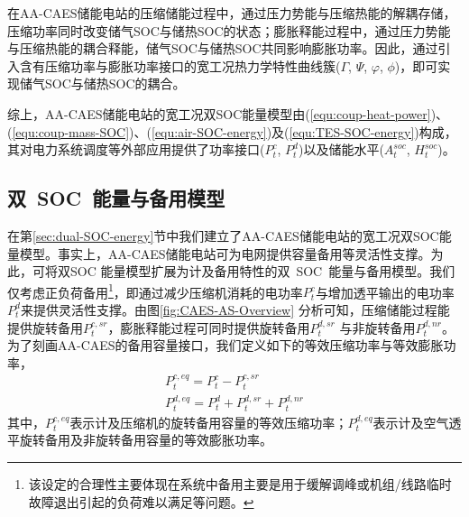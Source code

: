在AA-CAES储能电站的压缩储能过程中，通过压力势能与压缩热能的解耦存储，压缩功率同时改变储气SOC与储热SOC的状态；膨胀释能过程中，通过压力势能与压缩热能的耦合释能，储气SOC与储热SOC共同影响膨胀功率。因此，通过引入含有压缩功率与膨胀功率接口的宽工况热力学特性曲线簇($\Gamma$, $\Psi$, $\varphi$, $\phi$)，即可实现储气SOC与储热SOC的耦合。

综上，AA-CAES储能电站的宽工况双SOC能量模型由(\ref{equ:coup-heat-power})、(\ref{equ:coup-mass-SOC})、(\ref{equ:air-SOC-energy})及(\ref{equ:TES-SOC-energy})构成，其对电力系统调度等外部应用提供了功率接口($P_t^c$, $P_t^d$)以及储能水平($A_t^{soc}$, $H_t^{soc}$)。

\subsection{双~SOC~能量与备用模型}
\label{sec:dual-SOC-Reserve}

在第\ref{sec:dual-SOC-energy}节中我们建立了AA-CAES储能电站的宽工况双SOC能量模型。事实上，AA-CAES储能电站可为电网提供容量备用等灵活性支撑。为此，可将双SOC 能量模型扩展为计及备用特性的双~SOC~能量与备用模型。我们仅考虑正负荷备用\footnote{该设定的合理性主要体现在系统中备用主要是用于缓解调峰或机组/线路临时故障退出引起的负荷难以满足等问题。}，即通过减少压缩机消耗的电功率$P_t^c$与增加透平输出的电功率$P_t^d$来提供灵活性支撑。由图\ref{fig:CAES-AS-Overview} 分析可知，压缩储能过程能提供旋转备用$P_t^{c,sr}$，膨胀释能过程可同时提供旋转备用$P_t^{d,sr}$ 与非旋转备用$P_t^{d,nr}$。为了刻画AA-CAES的备用容量接口，我们定义如下的等效压缩功率与等效膨胀功率，
\begin{subequations}
\label{equ:def-Pc-Pd-eq}
\begin{gather}
P_t^{c,eq} = P_t^c - P_t^{c,sr}\label{equ:def-Pc-eq}\\
P_t^{d,eq} = P_t^d + P_t^{d,sr} + P_t^{d,nr}\label{equ:def-Pd-eq}
\end{gather}
\end{subequations}
其中，$P_t^{c,eq}$表示计及压缩机的旋转备用容量的等效压缩功率；$P_t^{d,eq}$表示计及空气透平旋转备用及非旋转备用容量的等效膨胀功率。

